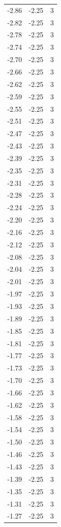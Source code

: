\begin{longtable}{lrr}
  -2.86 & -2.25 & 3 \\
  -2.82 & -2.25 & 3 \\
  -2.78 & -2.25 & 3 \\
  -2.74 & -2.25 & 3 \\
  -2.70 & -2.25 & 3 \\
  -2.66 & -2.25 & 3 \\
  -2.62 & -2.25 & 3 \\
  -2.59 & -2.25 & 3 \\
  -2.55 & -2.25 & 3 \\
  -2.51 & -2.25 & 3 \\
  -2.47 & -2.25 & 3 \\
  -2.43 & -2.25 & 3 \\
  -2.39 & -2.25 & 3 \\
  -2.35 & -2.25 & 3 \\
  -2.31 & -2.25 & 3 \\
  -2.28 & -2.25 & 3 \\
  -2.24 & -2.25 & 3 \\
  -2.20 & -2.25 & 3 \\
  -2.16 & -2.25 & 3 \\
  -2.12 & -2.25 & 3 \\
  -2.08 & -2.25 & 3 \\
  -2.04 & -2.25 & 3 \\
  -2.01 & -2.25 & 3 \\
  -1.97 & -2.25 & 3 \\
  -1.93 & -2.25 & 3 \\
  -1.89 & -2.25 & 3 \\
  -1.85 & -2.25 & 3 \\
  -1.81 & -2.25 & 3 \\
  -1.77 & -2.25 & 3 \\
  -1.73 & -2.25 & 3 \\
  -1.70 & -2.25 & 3 \\
  -1.66 & -2.25 & 3 \\
  -1.62 & -2.25 & 3 \\
  -1.58 & -2.25 & 3 \\
  -1.54 & -2.25 & 3 \\
  -1.50 & -2.25 & 3 \\
  -1.46 & -2.25 & 3 \\
  -1.43 & -2.25 & 3 \\
  -1.39 & -2.25 & 3 \\
  -1.35 & -2.25 & 3 \\
  -1.31 & -2.25 & 3 \\
  -1.27 & -2.25 & 3 \\

\end{longtable}
